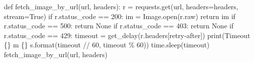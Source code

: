 \documentclass[
  a4paper,
]{book}
\newenvironment{Shaded}{\begin{snugshade}}{\end{snugshade}}
\newcommand{\BuiltInTok}[1]{\textcolor[rgb]{0.00,0.23,0.31}{#1}}
\newcommand{\ControlFlowTok}[1]{\textcolor[rgb]{0.00,0.23,0.31}{#1}}
\newcommand{\DecValTok}[1]{\textcolor[rgb]{0.68,0.00,0.00}{#1}}
\newcommand{\KeywordTok}[1]{\textcolor[rgb]{0.00,0.23,0.31}{#1}}
\newcommand{\NormalTok}[1]{\textcolor[rgb]{0.00,0.23,0.31}{#1}}
\newcommand{\OperatorTok}[1]{\textcolor[rgb]{0.37,0.37,0.37}{#1}}
\newcommand{\SpecialCharTok}[1]{\textcolor[rgb]{0.37,0.37,0.37}{#1}}
\newcommand{\StringTok}[1]{\textcolor[rgb]{0.13,0.47,0.30}{#1}}
\newcommand{\VariableTok}[1]{\textcolor[rgb]{0.07,0.07,0.07}{#1}}
\begin{document}
\begin{Shaded}
\begin{Highlighting}[]
\KeywordTok{def}\NormalTok{ fetch\_image\_by\_url(url, headers):}
\NormalTok{    r }\OperatorTok{=}\NormalTok{ requests.get(url, headers}\OperatorTok{=}\NormalTok{headers, stream}\OperatorTok{=}\VariableTok{True}\NormalTok{)}
    \ControlFlowTok{if}\NormalTok{ r.status\_code }\OperatorTok{==} \DecValTok{200}\NormalTok{:}
\NormalTok{        im }\OperatorTok{=}\NormalTok{ Image.}\BuiltInTok{open}\NormalTok{(r.raw)}
        \ControlFlowTok{return}\NormalTok{ im}
    \ControlFlowTok{if}\NormalTok{ r.status\_code }\OperatorTok{==} \DecValTok{500}\NormalTok{:}
        \ControlFlowTok{return} \VariableTok{None}
    \ControlFlowTok{if}\NormalTok{ r.status\_code }\OperatorTok{==} \DecValTok{403}\NormalTok{:}
        \ControlFlowTok{return} \VariableTok{None}
    \ControlFlowTok{if}\NormalTok{ r.status\_code }\OperatorTok{==} \DecValTok{429}\NormalTok{:}
\NormalTok{        timeout }\OperatorTok{=}\NormalTok{ get\_delay(r.headers[}\StringTok{\textquotesingle{}retry{-}after\textquotesingle{}}\NormalTok{])}
        \BuiltInTok{print}\NormalTok{(}\StringTok{\textquotesingle{}Timeout }\SpecialCharTok{\{\}}\StringTok{ m }\SpecialCharTok{\{\}}\StringTok{ s\textquotesingle{}}\NormalTok{.}\BuiltInTok{format}\NormalTok{(timeout }\OperatorTok{//} \DecValTok{60}\NormalTok{, timeout }\OperatorTok{\%} \DecValTok{60}\NormalTok{))}
\NormalTok{        time.sleep(timeout)}
\NormalTok{        fetch\_image\_by\_url(url, headers)}


\end{Highlighting}
\end{Shaded}
\end{document}
